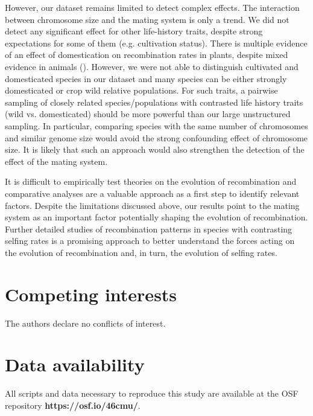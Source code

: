 \documentclass{article}
\begin{document}
However, our dataset remains limited to detect complex effects. The interaction between chromosome size and the mating system is only a trend. We did not detect any significant effect for other life-history traits, despite strong expectations for some of them (e.g. cultivation status). There is multiple evidence of an effect of domestication on recombination rates in plants, despite mixed evidence in animals (\cite{ross-ibarraGenomeSizeRecombination2007a,dreissigVariationRecombinationRate2019,fuentesDomesticationShapesRecombination2021,schreiberRecombinationLandscapeDivergence2022,munoz-fuentesStrongArtificialSelection2015}). However, we were not able to distinguish cultivated and domesticated species in our dataset and many species can be either strongly domesticated or crop wild relative populations. For such traits, a pairwise sampling of closely related species/populations with contrasted life history traits (wild vs. domesticated) should be more powerful than our large unstructured sampling. In particular, comparing species with the same number of chromosomes and similar genome size would avoid the strong confounding effect of chromosome size. It is likely that such an approach would also strengthen the detection of the effect of the mating system.


It is difficult to empirically test theories on the evolution of recombination and comparative analyses are a valuable approach as a first step to identify relevant factors. Despite the limitations discussed above, our results point to the mating system as an important factor potentially shaping the evolution of recombination. Further detailed studies of recombination patterns in species with contrasting selfing rates is a promising approach to better understand the forces acting on the evolution of recombination and, in turn, the evolution of selfing rates.



\section*{Competing interests}

The authors declare no conflicts of interest.


\section*{Data availability} 

All scripts and data necessary to reproduce this study are available at the OSF repository \textbf{https://osf.io/46cmu/}.
\end{document}
